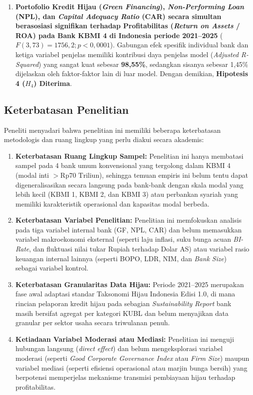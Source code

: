 \documentclass[12pt,a4paper]{article}
\numberwithin{equation}{section}
\begin{document}
\begin{enumerate}
  \item \textbf{Portofolio Kredit Hijau (\emph{Green Financing}), \emph{Non-Performing Loan} (NPL), dan \emph{Capital Adequacy Ratio} (CAR) secara simultan berasosiasi signifikan terhadap Profitabilitas (\emph{Return on Assets} / ROA) pada Bank KBMI 4 di Indonesia periode 2021--2025} ($F(3, 73) = 1756{,}2; p < 0{,}0001$). Gabungan efek spesifik individual bank dan ketiga variabel penjelas memiliki kontribusi daya penjelas model (\emph{Adjusted R-Squared}) yang sangat kuat sebesar \textbf{98,55\%}, sedangkan sisanya sebesar 1,45\% dijelaskan oleh faktor-faktor lain di luar model. Dengan demikian, \textbf{Hipotesis 4 ($H_4$) Diterima}.
\end{enumerate}

\subsection{Keterbatasan Penelitian}

\noindent
Peneliti menyadari bahwa penelitian ini memiliki beberapa keterbatasan metodologis dan ruang lingkup yang perlu diakui secara akademis:
\begin{enumerate}
  \item \textbf{Keterbatasan Ruang Lingkup Sampel:} Penelitian ini hanya membatasi sampel pada 4 bank umum konvensional yang tergolong dalam KBMI 4 (modal inti $> \text{Rp}70 \text{ Triliun}$), sehingga temuan empiris ini belum tentu dapat digeneralisasikan secara langsung pada bank-bank dengan skala modal yang lebih kecil (KBMI 1, KBMI 2, dan KBMI 3) atau perbankan syariah yang memiliki karakteristik operasional dan kapasitas modal berbeda.
  \item \textbf{Keterbatasan Variabel Penelitian:} Penelitian ini memfokuskan analisis pada tiga variabel internal bank (GF, NPL, CAR) dan belum memasukkan variabel makroekonomi eksternal (seperti laju inflasi, suku bunga acuan \emph{BI-Rate}, dan fluktuasi nilai tukar Rupiah terhadap Dolar AS) atau variabel rasio keuangan internal lainnya (seperti BOPO, LDR, NIM, dan \emph{Bank Size}) sebagai variabel kontrol.
  \item \textbf{Keterbatasan Granularitas Data Hijau:} Periode 2021--2025 merupakan fase awal adaptasi standar Taksonomi Hijau Indonesia Edisi 1.0, di mana rincian pelaporan kredit hijau pada sebagian \emph{Sustainability Report} bank masih bersifat agregat per kategori KUBL dan belum menyajikan data granular per sektor usaha secara triwulanan penuh.
  \item \textbf{Ketiadaan Variabel Moderasi atau Mediasi:} Penelitian ini menguji hubungan langsung (\emph{direct effect}) dan belum mengeksplorasi variabel moderasi (seperti \emph{Good Corporate Governance Index} atau \emph{Firm Size}) maupun variabel mediasi (seperti efisiensi operasional atau marjin bunga bersih) yang berpotensi memperjelas mekanisme transmisi pembiayaan hijau terhadap profitabilitas.
\end{enumerate}
\end{document}
